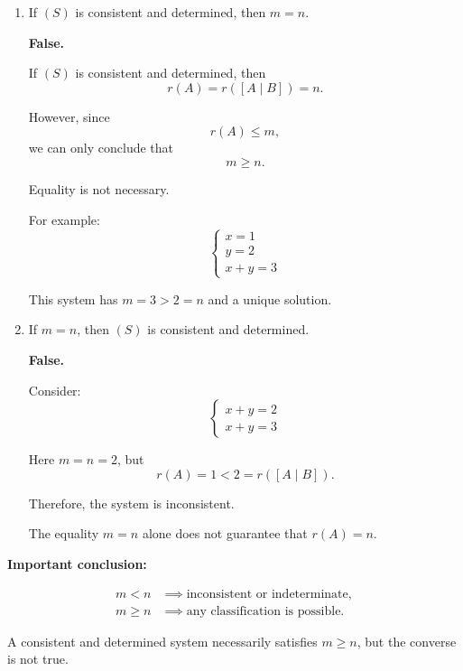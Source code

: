 \begin{enumerate}[label=\alph*)]
\begin{answer}
        If
        $$
        r(A)<r([A\mid B]),
        $$
        the system is inconsistent.

        Otherwise,
        $$
        r(A)=r([A\mid B])<n,
        $$
        and the system is consistent
        and indeterminate.

        Thus, it cannot be consistent
        and determined.
    \end{answer}

    \item If $(S)$ is consistent and
    determined, then $m=n$.

    \begin{answer}
        \textbf{False.}

        If $(S)$ is consistent and
        determined, then
        $$
        r(A)=r([A\mid B])=n.
        $$

        However, since
        $$
        r(A)\leq m,
        $$
        we can only conclude that
        $$
        \boxed{m\geq n}.
        $$

        Equality is not necessary.

        For example:
        $$
        \begin{cases}
            x=1\\
            y=2\\
            x+y=3
        \end{cases}
        $$

        This system has $m=3>2=n$
        and a unique solution.
    \end{answer}

    \item If $m=n$, then $(S)$ is
    consistent and determined.

    \begin{answer}
        \textbf{False.}

        Consider:
        $$
        \begin{cases}
            x+y=2\\
            x+y=3
        \end{cases}
        $$

        Here $m=n=2$, but
        $$
        r(A)=1<2=r([A\mid B]).
        $$

        Therefore, the system is
        inconsistent.

        The equality $m=n$ alone
        does not guarantee that
        $r(A)=n$.
    \end{answer}

\end{enumerate}

{\color{red}
\textbf{Important conclusion:}

$$
\begin{aligned}
m<n&\implies
\text{inconsistent or indeterminate},\\
m\geq n&\implies
\text{any classification is possible}.
\end{aligned}
$$

A consistent and determined system
necessarily satisfies $m\geq n$,
but the converse is not true.
}

